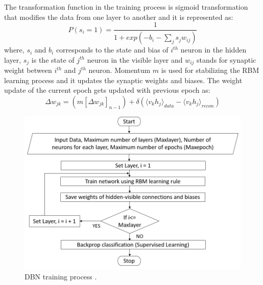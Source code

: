The transformation function in the training process is sigmoid transformation that modifies the data from one layer to another and it is represented as:
\begin{equation}
    P(s_i = 1) = \frac{1}{1 + exp(-b_i - \sum_j s_j w_{ij})}
\end{equation}
where, $s_i$ and $b_i$ corresponds to the state and bias of $i^{th}$ neuron in the hidden layer, $s_j$ is the state of $j^{th}$ neuron in the visible layer and  $w_{ij}$ stands for synaptic weight between $i^{th}$ and $j^{th}$ neuron. Momentum $m$ is used for stabilizing the RBM learning process and it updates the synaptic weights and biases. The weight update of the current epoch gets updated with previous epoch as:
\begin{equation}
    \Delta w_{jk} = (m[\Delta w_{jk}]_{n-1}) + \delta(\langle v_k h_j \rangle_{data} - \langle v_k h_j \rangle_{recon})
\end{equation}
\begin{figure}[t]
	\centering
	\includegraphics[scale=0.4]{gfx/Ed_dbn2.PNG}
    \captionsetup{justification=centering}
	\caption{DBN training process \cite{DBLP:journals/ress/TamilselvanW13}.}
	\label{fig:DBN_training_structure}
\end{figure}
